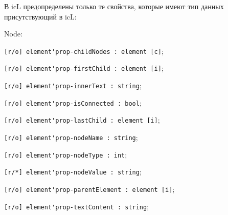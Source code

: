 В icL предопределены только те свойства, которые имеют тип данных присутствующий в icL:
\begin{icItems}
	\item Node:	
	\begin{icItems}
		\item \lstinline|[r/o] element'prop-childNodes : element [c]|;
		\item \lstinline|[r/o] element'prop-firstChild : element [i]|;
		\item \lstinline|[r/o] element'prop-innerText : string|;
		\item \lstinline|[r/o] element'prop-isConnected : bool|;
		\item \lstinline|[r/o] element'prop-lastChild : element [i]|;
		\item \lstinline|[r/o] element'prop-nodeName : string|;
		\item \lstinline|[r/o] element'prop-nodeType : int|;
		\item \lstinline|[r/*] element'prop-nodeValue : string|;
		\item \lstinline|[r/o] element'prop-parentElement : element [i]|;
		\item \lstinline|[r/o] element'prop-textContent : string|;
	\end{icItems}
	

\end{icItems}
